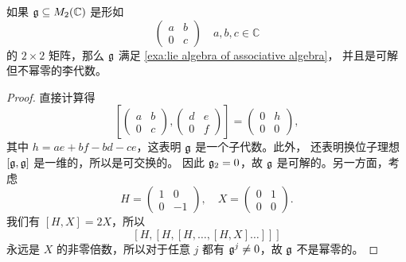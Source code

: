 \begin{proposition}
  如果 $\mathfrak{g}\subseteq  M_2(\mathbb{C})$ 是形如
  \[
    \begin{pmatrix}
      a & b \\ 0 & c
    \end{pmatrix}\quad a,b,c\in \mathbb{C}
  \]
  的 $2\times 2$ 矩阵，那么 $\mathfrak{g}$ 满足 \autoref{exa:lie algebra of associative algebra}，
  并且是可解但不幂零的李代数。
\end{proposition}
\begin{proof}
  直接计算得 
  \[
    \left[\begin{pmatrix}
      a & b \\ 0 & c
    \end{pmatrix},\begin{pmatrix}
      d & e \\ 0 & f
    \end{pmatrix}\right]=\begin{pmatrix}
      0 & h \\ 0 & 0 
    \end{pmatrix},
  \]
  其中 $h=ae+bf-bd-ce$，这表明 $\mathfrak{g}$ 是一个子代数。此外，
  还表明换位子理想 $[\mathfrak{g},\mathfrak{g}]$ 是一维的，所以是可交换的。
  因此 $\mathfrak{g}_2=0$，故 $\mathfrak{g}$ 是可解的。另一方面，考虑
  \[
    H=\begin{pmatrix}
      1 & 0 \\ 0 & -1
    \end{pmatrix},\quad
    X=\begin{pmatrix}
      0 & 1 \\ 0 & 0
    \end{pmatrix}.
  \]
  我们有 $[H,X]=2X$，所以
  \[
    [H,[H,[H,\dots,[H,X]\dots]]]
  \]
  永远是 $X$ 的非零倍数，所以对于任意 $j$ 都有 $\mathfrak{g}^j\neq 0$，故 $\mathfrak{g}$ 不是幂零的。
\end{proof}








 




